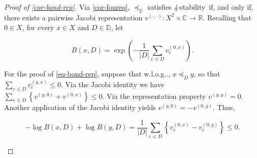 \documentclass[ecta,nameyear,draft]{econsocart}
\makeatletter
\newcommand{\R}{\mathbb R}
\newcommand{\mbbd}{{\mathds D}}
\newcommand{\mbbc}{{\mathds C}}
\newcommand{\xy}{{(x, y)}}
\newcommand{\yx}{{(y, x)}}
\newcommand{\dd}{{(\cdot,\cdot)}}
\newcommand{\stability}{\textit{4}-\textup{{stability}}}
\newcommand\withoutlog{w\@.l\@.o\@.g\@ifnextchar.{}{.\@}}
\theoremstyle{plain}
\theoremstyle{remark}
\makeatother
\begin{document}
\begin{proof}[Proof of \cref{cor-bond-rep}] Via \cref{cor-foureq},
  $\preceq_{\mbbd}$ satisfies \stability\ if, and only if, there exists a
  pairwise Jacobi representation $v^{\dd}: X^{2} \times \mbbc \rightarrow \R$.
  Recalling that $0 \in X$, for every $x\in X$ and $D \in \mbbd$, let
  \begin{linenomath*}
    \begin{equation}\label{eq-bond-vxy} \textstyle B(x,D) = \exp\left(
        -\frac{1}{\lvert D \rvert} \sum_{c\,\in D}
      v^{(0, x)}_{c} \right).
    \end{equation}
  \end{linenomath*}
  For the proof of \eqref{eq-bond-rep}, suppose that \withoutlog, $x
  \preceq_{D} y$, so that $\sum_{c\,\in D} v^{\yx}_{c} \leq 0$. Via the Jacobi
  identity we
  have $ \sum_{c\,\in D} \left\{v^{(y,0)} + v^{(0,x)} \right\} \leq 0$.  Via
  the representation property $v^{(y, y)} = 0$.  Another application of the
  Jacobi identity yields $v^{(y, 0)} = -v^{(0, y)}$. Thus, 
  \begin{linenomath*}
    \begin{equation*}\textstyle - \log B(x,D) + \log B(y,D) = \frac{1}{\lvert
      D\rvert}
      \sum_{c\,\in D} \left \{v^{(0, x)}_{c} - v^{(0, y)}_{c}\right \} \leq 0.
    \end{equation*}
  \end{linenomath*}


\end{proof}
\end{document}
